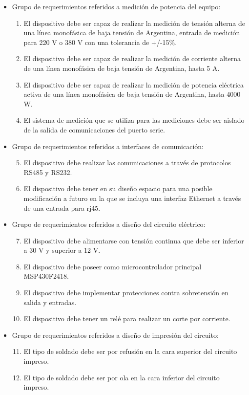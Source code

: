 \begin{itemize}
\item Grupo de requerimientos referidos a medición de potencia del equipo:
\begin{enumerate}
\item El dispositivo debe ser capaz de realizar la medición de tensión alterna de una línea monofásica de baja tensión de Argentina, entrada de medición para 220 V o 380 V con una tolerancia de +/-15\%.
\item El dispositivo debe ser capaz de realizar la medición de corriente alterna de una línea monofásica de baja tensión de Argentina, hasta 5 A.
\item El dispositivo debe ser capaz de realizar la medición de potencia eléctrica activa de una línea monofásica de baja tensión de Argentina, hasta 4000 W.
\item El sistema de medición que se utiliza para las mediciones debe ser aislado de la salida de comunicaciones del puerto serie.
\end{enumerate}

\item Grupo de requerimientos referidos a interfaces de comunicación:
\begin{enumerate}
\setcounter{enumi}{4}
\item El dispositivo debe realizar las comunicaciones a través de protocolos RS485 y RS232.
\item El dispositivo debe tener en su diseño espacio para una posible modificación a futuro en la que se incluya una interfaz Ethernet a través de una entrada para rj45.
\end{enumerate}

\item Grupo de requerimientos referidos a diseño del circuito eléctrico:
\begin{enumerate}
\setcounter{enumi}{6}
\item El dispositivo debe alimentarse con tensión continua que debe ser inferior a 30 V y superior a 12 V.
\item El dispositivo debe poseer como microcontrolador principal MSP430F2418.
\item El dispositivo debe implementar protecciones contra sobretensión en salida y entradas.
\item El dispositivo debe tener un relé para realizar un corte por corriente.
\end{enumerate}

\item Grupo de requerimientos referidos a diseño  de impresión del circuito:
\begin{enumerate}
\setcounter{enumi}{10}
\item El tipo de soldado debe ser por refusión en la cara superior del circuito impreso.

\item El tipo de soldado debe ser por ola en la cara inferior del circuito impreso.
\end{enumerate}
\end{itemize}


